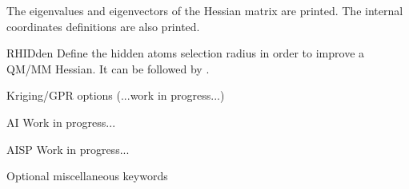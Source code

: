 \begin{keywordlist}
The eigenvalues and eigenvectors of the Hessian matrix
are printed. The internal coordinates definitions are also printed.
\item[RHIDden]
Define the hidden atoms selection radius in order to improve a QM/MM Hessian. It can be followed by .
\end{keywordlist}

Kriging/GPR options (...work in progress...)
\begin{keywordlist}
\item[AI  ]
Work in progress...
\item[AISP]
Work in progress...
\end{keywordlist}
Optional miscellaneous keywords

